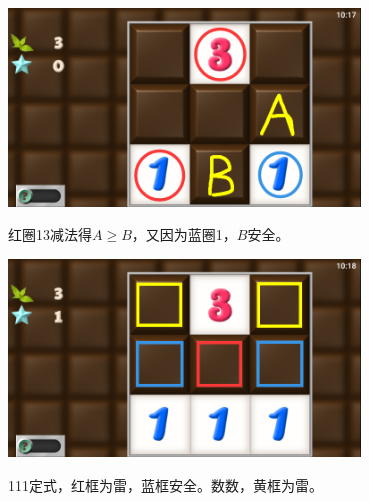 \subsection{} %
\begin{center}
    \includegraphics[width=0.7\textwidth]{puzzle/18-1.png}
\end{center}
红圈13减法得$A\ge B$，又因为蓝圈1，$B$安全。
\begin{center}
    \includegraphics[width=0.7\textwidth]{puzzle/18-2.png}
\end{center}
111定式，红框为雷，蓝框安全。数数，黄框为雷。

